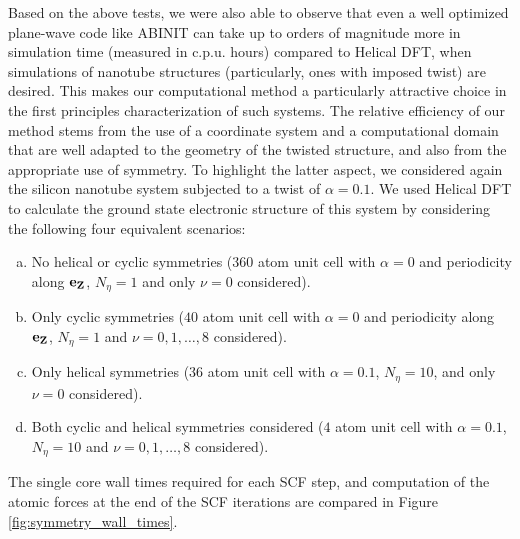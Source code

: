 \documentclass[preprint,12pt, 3p, sort&compress]{elsarticle}
\begin{document}
Based on the above tests, we were also able to observe that even a well optimized  plane-wave code like ABINIT can take up to orders of magnitude more in simulation time (measured in c.p.u. hours) compared to Helical DFT, when simulations of nanotube structures (particularly, ones with imposed twist) are desired. This makes our computational method a particularly attractive choice in the first principles characterization of such systems. The relative efficiency of our method stems from the use of a coordinate system and a computational domain that are well adapted to the geometry of the twisted structure, and also from the appropriate use of symmetry. To highlight the latter aspect, we considered again the silicon nanotube system subjected to a twist of $\alpha = 0.1$. We used Helical DFT to calculate the ground state electronic structure of this system by considering the following four equivalent scenarios: 
\begin{enumerate}[(a)]
\item No helical or cyclic symmetries ($360$ atom unit cell with $\alpha = 0$ and periodicity along ${\bf e}_{{\bf Z}}$, $N_{\eta} = 1$ and only $\nu = 0$ considered).
\item Only cyclic symmetries ($40$ atom unit cell with $\alpha = 0$ and periodicity along ${\bf e}_{{\bf Z}}$, $N_{\eta} = 1$ and $\nu = 0,1,\ldots,8$ considered).
\item Only helical symmetries ($36$ atom unit cell with $\alpha = 0.1$, $N_{\eta} = 10$, and only $\nu = 0$ considered).
\item Both cyclic and helical symmetries considered ($4$ atom unit cell with $\alpha = 0.1$, $N_{\eta} = 10$ and $\nu = 0,1,\ldots,8$ considered).
\end{enumerate}
The single core wall times required for each SCF step, and computation of the atomic forces at the end of the SCF iterations are compared in Figure \ref{fig:symmetry_wall_times}. 
\end{document}
